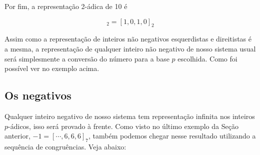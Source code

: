 \documentclass{report}
\newcommand*{\padc}[2]{\left[#1\right]_{#2}}
\theoremstyle{definition}
\begin{document}
{\begin{minipage}{300pt}
    Por fim, a representação 2-ádica de 10 é

    \begin{equation*}
        [\ldots,0,0,1,0,1,0]_2 = [1,0,1,0]_2
    \end{equation*}
    
\end{minipage}}

\bigskip    

Assim como a representação de inteiros não negativos esquerdistas e direitistas é a mesma, a representação de qualquer inteiro não negativo de nosso sistema usual será simplesmente a conversão do número para a base $p$ escolhida. Como foi possível ver no exemplo acima.

\subsection{Os negativos}

Qualquer inteiro negativo de nosso sistema tem representação infinita nos inteiros $p$-ádicos, isso será provado à frente. Como visto no último exemplo da Seção anterior, $-1 = \padc{\cdots,6,6,6}{7}$, também podemos chegar nesse resultado utilizando a sequência de congruências. Veja abaixo:
\end{document}
